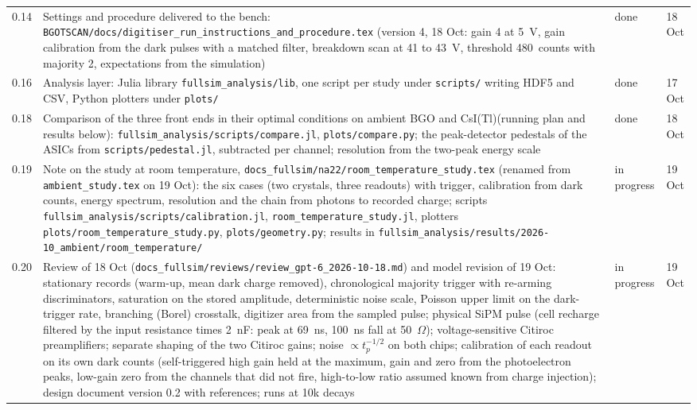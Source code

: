 \documentclass[11pt]{article}
\newcommand{\code}[1]{\texttt{#1}}
\newcommand{\csitl}{CsI(Tl)\xspace}
\newcommand{\doing}{in progress}
\newcommand{\done}{done}
\begin{document}
\begin{longtable}{p{} p{} p{} p{}}
0.14 & Settings and procedure delivered to the bench: \code{BGOTSCAN/docs/digitiser\_run\_instructions\_and\_procedure.tex} (version 4, 18 Oct: gain 4 at 5~V, gain calibration from the dark pulses with a matched filter, breakdown scan at 41 to 43~V, threshold 480~counts with majority 2, expectations from the simulation) & \done & 18 Oct \\
0.16 & Analysis layer: Julia library \code{fullsim\_analysis/lib}, one script per study under \code{scripts/} writing HDF5 and CSV, Python plotters under \code{plots/} & \done & 17 Oct \\
0.18 & Comparison of the three front ends in their optimal conditions on ambient BGO and \csitl (running plan and results below): \code{fullsim\_analysis/scripts/compare.jl}, \code{plots/compare.py}; the peak-detector pedestals of the ASICs from \code{scripts/pedestal.jl}, subtracted per channel; resolution from the two-peak energy scale & \done & 18 Oct \\
0.19 & Note on the study at room temperature, \code{docs\_fullsim/na22/room\_temperature\_study.tex} (renamed from \code{ambient\_study.tex} on 19 Oct): the six cases (two crystals, three readouts) with trigger, calibration from dark counts, energy spectrum, resolution and the chain from photons to recorded charge; scripts \code{fullsim\_analysis/scripts/calibration.jl}, \code{room\_temperature\_study.jl}, plotters \code{plots/room\_temperature\_study.py}, \code{plots/geometry.py}; results in \code{fullsim\_analysis/results/2026-10\_ambient/room\_temperature/} & \doing & 19 Oct \\
0.20 & Review of 18 Oct (\code{docs\_fullsim/reviews/review\_gpt-6\_2026-10-18.md}) and model revision of 19 Oct: stationary records (warm-up, mean dark charge removed), chronological majority trigger with re-arming discriminators, saturation on the stored amplitude, deterministic noise scale, Poisson upper limit on the dark-trigger rate, branching (Borel) crosstalk, digitizer area from the sampled pulse; physical SiPM pulse (cell recharge filtered by the input resistance times 2~nF: peak at 69~ns, 100~ns fall at 50~$\Omega$); voltage-sensitive Citiroc preamplifiers; separate shaping of the two Citiroc gains; noise $\propto t_p^{-1/2}$ on both chips; calibration of each readout on its own dark counts (self-triggered high gain held at the maximum, gain and zero from the photoelectron peaks, low-gain zero from the channels that did not fire, high-to-low ratio assumed known from charge injection); design document version 0.2 with references; runs at 10k decays & \doing & 19 Oct \\

\end{longtable}
\end{document}
